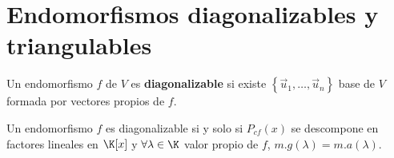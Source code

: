 \section{Endomorfismos diagonalizables y triangulables}
\begin{fdefinition}[]
	\normalfont Un endomorfismo $\displaystyle f $ de $\displaystyle V $ es \textbf{diagonalizable} si existe $\displaystyle \left\{ \vec{u}_{1}, \ldots, \vec{u}_{n}\right\}  $ base de $\displaystyle V $ formada por vectores propios de $\displaystyle f $.
\end{fdefinition}
\begin{ftheorem}[]
	\normalfont Un endomorfismo $\displaystyle f $ es diagonalizable si y solo si $\displaystyle P_{cf}\left(x\right) $ se descompone en factores lineales en $\displaystyle \K[x] $ y $\displaystyle \forall \lambda \in \K $ valor propio de $\displaystyle f $, $\displaystyle m.g\left(\lambda \right) = m.a\left(\lambda \right) $.
\end{ftheorem}
